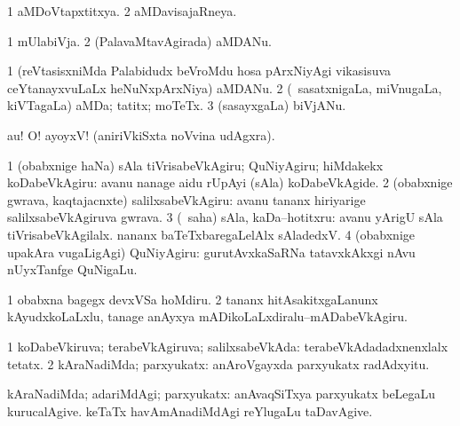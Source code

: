 \bentry
{}
\gl{\gu}
\bmng
\bnum
\num{1} aMDoVtapxtitxya. 
\num{2} aMDavisajaRneya. 
\enum
\emng
\eentry

\bentry
{}
\gl{\nA}
\bmng
\bnum
\num{1} mUlabiVja. 
\num{2} (PalavaMtavAgirada) aMDANu. 
\enum
\emng
\eentry

\bentry
{}
\gl{\nA}
\bmng
\bnum
\num{1} (reVtasisxniMda Palabidudx beVroMdu hosa pArxNiyAgi vikasisuva ceYtanayxvuLaLx heNuNxpArxNiya) aMDANu. 
\num{2} (\kanmu\ sasatxnigaLa, miVnugaLa, kiVTagaLa) aMDa; tatitx; moTeTx. 
\num{3} (sasayxgaLa) biVjANu. 
\enum
\emng
\eentry

\bentry
{}
\gl{\BAavayx}
\bmng
au! O! ayoyxV! (aniriVkiSxta noVvina udAgxra). 
\emng
\eentry

\bentry
{}
\gl{\sakirx}
\bmng
\bnum
\num{1} (obabxnige haNa) sAla tiVrisabeVkAgiru; QuNiyAgiru; hiMdakekx koDabeVkAgiru:  avanu nanage aidu rUpAyi (sAla) koDabeVkAgide. 
\num{2} (obabxnige gwrava, kaqtajacnxte) salilxsabeVkAgiru:  avanu tananx hiriyarige salilxsabeVkAgiruva gwrava. 
\num{3} (\akirx\ saha) sAla, kaDa--hotitxru:  avanu yArigU sAla tiVrisabeVkAgilalx.  nananx baTeTxbaregaLelAlx sAladedxV. 
\num{4} (obabxnige upakAra \mo vugaLigAgi) QuNiyAgiru:  gurutAvxkaSaRNa tatavxkAkxgi nAvu nUyxTanfge QuNigaLu. 
\enum
\emng

\noindent
\gl{\pagu}
\bmng
\bnum
\num{1}  obabxna bagegx devxVSa hoMdiru. 
\num{2}  tananx hitAsakitxgaLanunx kAyudxkoLaLxlu, tanage anAyxya mADikoLaLxdiralu--mADabeVkAgiru. 
\enum
\emng
\eentry

\bentry
{}
\gl{\Agu}
\bmng
\bnum
\num{1} koDabeVkiruva; terabeVkAgiruva; salilxsabeVkAda:  terabeVkAdadadxnenxlalx tetatx. 
\num{2} kAraNadiMda; parxyukatx:  anAroVgayxda parxyukatx radAdxyitu. 
\enum
\emng
\eentry

\bentry
{}
\gl{\upa}
\bmng
kAraNadiMda; adariMdAgi; parxyukatx:  anAvaqSiTxya parxyukatx beLegaLu kurucalAgive.  keTaTx havAmAnadiMdAgi reYlugaLu taDavAgive. 
\emng
\eentry

